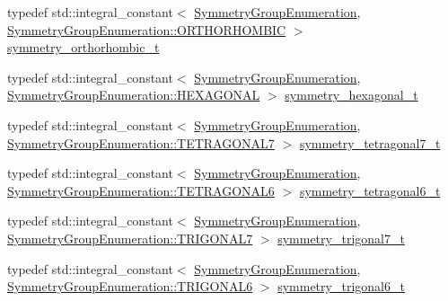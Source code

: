 \begin{DoxyCompactItemize}
\item 
typedef std\+::integral\+\_\+constant$<$ \mbox{\hyperlink{namespacempc_1_1core_a9d979684062547055a0ef5c13077bad8}{Symmetry\+Group\+Enumeration}}, \mbox{\hyperlink{namespacempc_1_1core_a9d979684062547055a0ef5c13077bad8a45ddba8b47424b406a313caed88b091a}{Symmetry\+Group\+Enumeration\+::\+O\+R\+T\+H\+O\+R\+H\+O\+M\+B\+IC}} $>$ \mbox{\hyperlink{namespacempc_1_1core_a4eef5d2c2b920fd8250780f64555fe56}{symmetry\+\_\+orthorhombic\+\_\+t}}
\item 
typedef std\+::integral\+\_\+constant$<$ \mbox{\hyperlink{namespacempc_1_1core_a9d979684062547055a0ef5c13077bad8}{Symmetry\+Group\+Enumeration}}, \mbox{\hyperlink{namespacempc_1_1core_a9d979684062547055a0ef5c13077bad8a5d7adeeaa10073a6a3c5bd970a7f958b}{Symmetry\+Group\+Enumeration\+::\+H\+E\+X\+A\+G\+O\+N\+AL}} $>$ \mbox{\hyperlink{namespacempc_1_1core_a8def77cb2eb2da6f3f4fca3b77bedd52}{symmetry\+\_\+hexagonal\+\_\+t}}
\item 
typedef std\+::integral\+\_\+constant$<$ \mbox{\hyperlink{namespacempc_1_1core_a9d979684062547055a0ef5c13077bad8}{Symmetry\+Group\+Enumeration}}, \mbox{\hyperlink{namespacempc_1_1core_a9d979684062547055a0ef5c13077bad8aea4a27c3d1e79d6a65ab91e165ba6d73}{Symmetry\+Group\+Enumeration\+::\+T\+E\+T\+R\+A\+G\+O\+N\+A\+L7}} $>$ \mbox{\hyperlink{namespacempc_1_1core_a79a28757f34cb27302c53b368452329c}{symmetry\+\_\+tetragonal7\+\_\+t}}
\item 
typedef std\+::integral\+\_\+constant$<$ \mbox{\hyperlink{namespacempc_1_1core_a9d979684062547055a0ef5c13077bad8}{Symmetry\+Group\+Enumeration}}, \mbox{\hyperlink{namespacempc_1_1core_a9d979684062547055a0ef5c13077bad8a63dabd41a700b44f934a19db4e0f8f83}{Symmetry\+Group\+Enumeration\+::\+T\+E\+T\+R\+A\+G\+O\+N\+A\+L6}} $>$ \mbox{\hyperlink{namespacempc_1_1core_abb8eb7f886d1f203879263524d6b8ecb}{symmetry\+\_\+tetragonal6\+\_\+t}}
\item 
typedef std\+::integral\+\_\+constant$<$ \mbox{\hyperlink{namespacempc_1_1core_a9d979684062547055a0ef5c13077bad8}{Symmetry\+Group\+Enumeration}}, \mbox{\hyperlink{namespacempc_1_1core_a9d979684062547055a0ef5c13077bad8ab347d6d7556c0d38dc3d111b08a50dee}{Symmetry\+Group\+Enumeration\+::\+T\+R\+I\+G\+O\+N\+A\+L7}} $>$ \mbox{\hyperlink{namespacempc_1_1core_a9bab7237b00addccb251ac236fd8d160}{symmetry\+\_\+trigonal7\+\_\+t}}
\item 
typedef std\+::integral\+\_\+constant$<$ \mbox{\hyperlink{namespacempc_1_1core_a9d979684062547055a0ef5c13077bad8}{Symmetry\+Group\+Enumeration}}, \mbox{\hyperlink{namespacempc_1_1core_a9d979684062547055a0ef5c13077bad8ad11b66b53c3c9dbfe73aa29a5d3df56c}{Symmetry\+Group\+Enumeration\+::\+T\+R\+I\+G\+O\+N\+A\+L6}} $>$ \mbox{\hyperlink{namespacempc_1_1core_af428acbfa5a27a2eceab3d2cdfb7f9ce}{symmetry\+\_\+trigonal6\+\_\+t}}

\end{DoxyCompactItemize}
